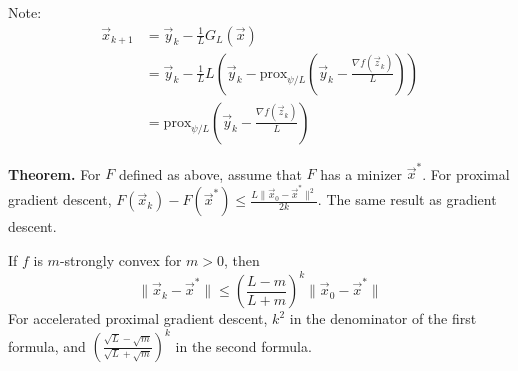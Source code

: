 \documentclass{article}
\newcommand{\x}{\vec{x}}                %
\newcommand{\y}{\vec{y}}                %
\newcommand{\z}{\vec{z}}                %
\newcommand{\rl}[1]{\left(#1\right)}
\begin{document}
Note:
\begin{align*}
    \x_{k + 1} &= \y_k - \frac{1}{L}G_L(\x) \\
    &= \y_k - \frac{1}{L}L\rl{\y_k - \text{prox}_{\psi/L}\rl{\y_k - \frac{\nabla f(\z_k)}{L}}} \\
    &= \text{prox}_{\psi/L}\rl{\y_k - \frac{\nabla f(\z_k)}{L}}
\end{align*}

\textbf{Theorem.} For $F$ defined as above, assume that $F$ has a minizer $\x^*$. For proximal gradient descent, $F(\x_k) - F(\x^*) \leq \frac{L\|\x_0 - \x^*\|^2}{2k}$. The same result as gradient descent.

If $f$ is $m$-strongly convex for $m > 0$, then
\[
    \|\x_k - \x^*\| \leq \rl{\frac{L - m}{L + m}}^k \|\x_0 - \x^*\|
\]
For accelerated proximal gradient descent, $k^2$ in the denominator of the first formula, and $\rl{\frac{\sqrt{L} - \sqrt{m}}{\sqrt{L} + \sqrt{m}}}^k$ in the second formula.
\end{document}
